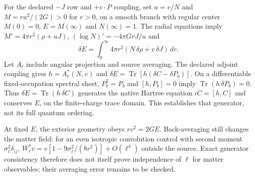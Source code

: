 For the declared $-J$ row and $+v\cdot P$ coupling, set $u=v/N$ and
$M=ru^2/(2G)>0$ for $r>0$, on a smooth branch with regular center
$M(0)=0$, $E=M(\infty)$ and $N(\infty)=1$.
The radial equations imply $M'=4\pi r^2(\rho+uJ)$,
$(\log N)'=-4\pi GrJ/u$ and
\[
 \delta E=\int_0^\infty4\pi r^2
             (N\,\delta\rho+v\,\delta J)\,dr .
\]
Let $A_\ell$ include angular projection and source averaging. The declared
adjoint coupling gives $h=A_\ell^*(N,v)$ and
$\delta E=\operatorname{Tr}[h(\delta C-\delta P_b)]$.
On a differentiable fixed-occupation spectral sheet, $P_b^2=P_b$ and
$[h,P_b]=0$ imply $\operatorname{Tr}(h\,\delta P_b)=0$.
Thus $\delta E=\operatorname{Tr}(h\,\delta C)$ generates the native Hartree
equation $i\dot C=[h,C]$ and conserves $E$, on the finite-charge trace domain.
This establishes that generator, not its full quantum ordering.

At fixed $E$, the exterior geometry obeys $rv^2=2GE$. Back-averaging still
changes the matter field: for an even isotropic convolution control with second moment
$\sigma_\ell^2\delta_{ij}$,
$W_\ell^*v=v[1-9\sigma_\ell^2/(8r^2)]+O(\ell^4)$ outside the source.
Exact generator consistency therefore does not itself prove independence
of $\ell$ for matter observables; their averaging error remains to be checked.
